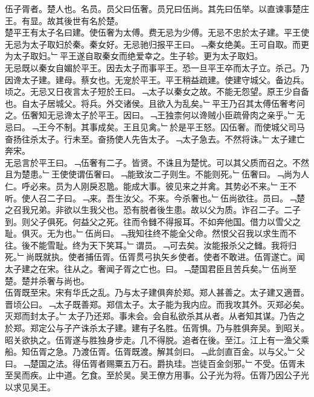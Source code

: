 \documentclass{zhvt-classic}
\begin{document}

\hspace*{2em}伍子胥者。楚人也。名员。员父曰伍奢。员兄曰伍尚。其先曰伍举。以直谏事楚庄王。有显。故其後世有名於楚。\\
\hspace*{2em}楚平王有太子名曰建。使伍奢为太傅。费无忌为少傅。无忌不忠於太子建。平王使无忌为太子取妇於秦。秦女好。无忌驰归报平王曰。﹁秦女绝美。王可自取。而更为太子取妇。﹂平王遂自取秦女而绝爱幸之。生子轸。更为太子取妇。\\
\hspace*{2em}无忌既以秦女自媚於平王。因去太子而事平王。恐一旦平王卒而太子立。杀己。乃因谗太子建。建母。蔡女也。无宠於平王。平王稍益疏建。使建守城父。备边兵。\\
\hspace*{2em}顷之。无忌又日夜言太子短於王曰。﹁太子以秦女之故。不能无怨望。原王少自备也。自太子居城父。将兵。外交诸侯。且欲入为乱矣。﹂平王乃召其太傅伍奢考问之。伍奢知无忌谗太子於平王。因曰。﹁王独柰何以谗贼小臣疏骨肉之亲乎。﹂无忌曰。﹁王今不制。其事成矣。王且见禽。﹂於是平王怒。囚伍奢。而使城父司马奋扬往杀太子。行未至。奋扬使人先告太子。﹁太子急去。不然将诛。﹂太子建亡奔宋。\\
\hspace*{2em}无忌言於平王曰。﹁伍奢有二子。皆贤。不诛且为楚忧。可以其父质而召之。不然且为楚患。﹂王使使谓伍奢曰。﹁能致汝二子则生。不能则死。﹂伍奢曰。﹁尚为人仁。呼必来。员为人刚戾忍卼。能成大事。彼见来之并禽。其势必不来。﹂王不听。使人召二子曰。﹁来。吾生汝父。不来。今杀奢也。﹂伍尚欲往。员曰。﹁楚之召我兄弟。非欲以生我父也。恐有脱者後生患。故以父为质。诈召二子。二子到。则父子俱死。何益父之死。往而令雠不得报耳。不如奔他国。借力以雪父之耻。俱灭。无为也。﹂伍尚曰。﹁我知往终不能全父命。然恨父召我以求生而不往。後不能雪耻。终为天下笑耳。﹂谓员。﹁可去矣。汝能报杀父之雠。我将归死。﹂尚既就执。使者捕伍胥。伍胥贯弓执矢乡使者。使者不敢进。伍胥遂亡。闻太子建之在宋。往从之。奢闻子胥之亡也。曰。﹁楚国君臣且苦兵矣。﹂伍尚至楚。楚并杀奢与尚也。\\
\hspace*{2em}伍胥既至宋。宋有华氏之乱。乃与太子建俱奔於郑。郑人甚善之。太子建又適晋。晋顷公曰。﹁太子既善郑。郑信太子。太子能为我内应。而我攻其外。灭郑必矣。灭郑而封太子。﹂太子乃还郑。事未会。会自私欲杀其从者。从者知其谋。乃告之於郑。郑定公与子产诛杀太子建。建有子名胜。伍胥惧。乃与胜俱奔吴。到昭关。昭关欲执之。伍胥遂与胜独身步走。几不得脱。追者在後。至江。江上有一渔父乘船。知伍胥之急。乃渡伍胥。伍胥既渡。解其剑曰。﹁此剑直百金。以与父。﹂父曰。﹁楚国之法。得伍胥者赐粟五万石。爵执珪。岂徒百金剑邪。﹂不受。伍胥未至吴而疾。止中道。乞食。至於吴。吴王僚方用事。公子光为将。伍胥乃因公子光以求见吴王。\\
\end{document}
